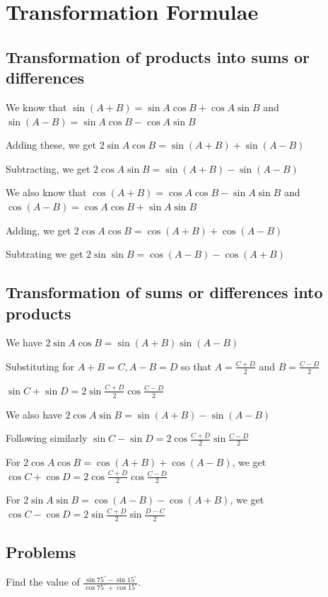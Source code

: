 \chapter{Transformation Formulae}
\section{Transformation of products into sums or differences}
We know that $\sin(A + B) = \sin A\cos B + \cos A\sin B$ and $\sin(A - B) = \sin A\cos B - \cos A\sin B$

\noindent Adding these, we get $2\sin A\cos B = \sin(A + B) + \sin(A - B)$

\noindent Subtracting, we get $2\cos A\sin B = \sin(A + B) - \sin (A - B)$

\noindent We also know that $\cos (A + B) = \cos A\cos B - \sin A\sin B$ and $\cos(A - B) = \cos A\cos B + \sin A\sin B$

\noindent Adding, we get $2\cos A\cos B = \cos (A + B) + \cos(A - B)$

\noindent Subtrating we get $2\sin \sin B = \cos (A - B) - \cos(A + B)$

\section{Transformation of sums or differences into products}
We have $2\sin A\cos B = \sin(A + B)\sin(A - B)$

\noindent Substituting for $A + B = C, A - B = D$ so that $A = \frac{C + D}{2}$ and $B = \frac{C- D}{2}$

\noindent $\sin C + \sin D = 2\sin \frac{C + D}{2}\cos \frac{C - D}{2}$

\noindent We also have $2\cos A\sin B = \sin(A + B) - \sin (A - B)$

\noindent Following similarly $\sin C - \sin D = 2\cos \frac{C + D}{2}\sin \frac{C - D}{2}$

\noindent For $2\cos A\cos B = \cos (A + B) + \cos(A - B)$, we get $\cos C + \cos D = 2\cos \frac{C + D}{2}\cos \frac{C - D}{2}$

\noindent For $2\sin A\sin B = \cos (A - B) - \cos(A + B)$, we get $\cos C - \cos D = 2\sin \frac{C + D}{2}\sin \frac{D - C}{2}$

\section{Problems}
\startitemize[n, 1*broad]
\item Find the value of $\frac{\sin 75^\circ - \sin 15^\circ}{\cos 75^\circ + \cos 15^\circ}$.

